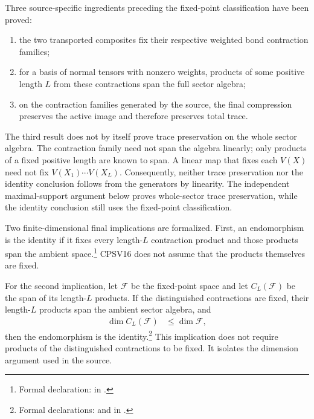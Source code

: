 \documentclass{article}
\begin{document}
Three source-specific ingredients preceding the fixed-point classification
have been proved:
\begin{enumerate}
    \item the two transported composites fix their respective weighted bond
          contraction families;
    \item for a basis of normal tensors with nonzero weights, products of some
          positive length $L$ from these contractions span the full sector
          algebra;
    \item on the contraction families generated by the source, the final
          compression preserves the active image and therefore preserves total
          trace.
\end{enumerate}
The third result does not by itself prove trace preservation on the whole
sector algebra. The contraction family need not span the algebra linearly;
only products of a fixed positive length are known to span. A linear map that
fixes each $V(X)$ need not fix
$V(X_1)\cdots V(X_L)$. Consequently, neither trace preservation nor the
identity conclusion follows from the generators by linearity. The independent
maximal-support argument below proves whole-sector trace preservation, while
the identity conclusion still uses the fixed-point classification.

Two finite-dimensional final implications are formalized. First, an
endomorphism is the identity if it fixes every length-$L$ contraction product
and those products span the ambient space.\footnote{Formal declaration:
in .}
CPSV16 does not assume that the products themselves are fixed.

For the second implication, let $\mathcal F$ be the fixed-point space and let
$C_L(\mathcal F)$ be the span of its length-$L$ products. If the distinguished
contractions are fixed, their length-$L$ products span the ambient sector
algebra, and
\begin{align}
    \dim C_L(\mathcal F)
        &\leq \dim\mathcal F,
    \label{eq:cpsv16_vertical_sector_invertibility_abstract_dimension_bound}
\end{align}
then the endomorphism is the identity.\footnote{Formal declarations:
 and
in .}
This implication does not require products of the distinguished contractions
to be fixed. It isolates the dimension argument used in the source.
\end{document}
